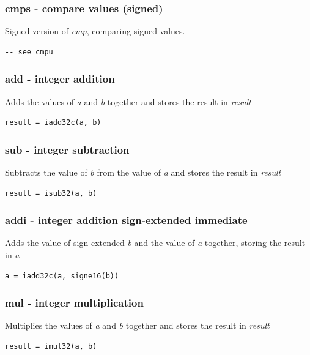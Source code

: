 \documentclass[a4paper,10pt]{article}
\begin{document}
\subsubsection{cmps - compare values (signed)}
	{Signed version of \emph{cmp}, comparing signed values.}
\begin{lstlisting}
-- see cmpu
\end{lstlisting}

\subsubsection{add - integer addition}
	{Adds the values of \emph{a} and \emph{b} together and stores the result in \emph{result}}
\begin{lstlisting}
result = iadd32c(a, b)
\end{lstlisting}

\subsubsection{sub - integer subtraction}
	{Subtracts the value of \emph{b} from the value of \emph{a} and stores the result in \emph{result}}
\begin{lstlisting}
result = isub32(a, b)
\end{lstlisting}

\subsubsection{addi - integer addition sign-extended immediate}
	{Adds the value of sign-extended \emph{b} and the value of \emph{a} together, storing the result in \emph{a}}
\begin{lstlisting}
a = iadd32c(a, signe16(b))
\end{lstlisting}

\subsubsection{mul - integer multiplication}
	{Multiplies the values of \emph{a} and \emph{b} together and stores the result in \emph{result}}
\begin{lstlisting}
result = imul32(a, b)
\end{lstlisting}

\end{document}
